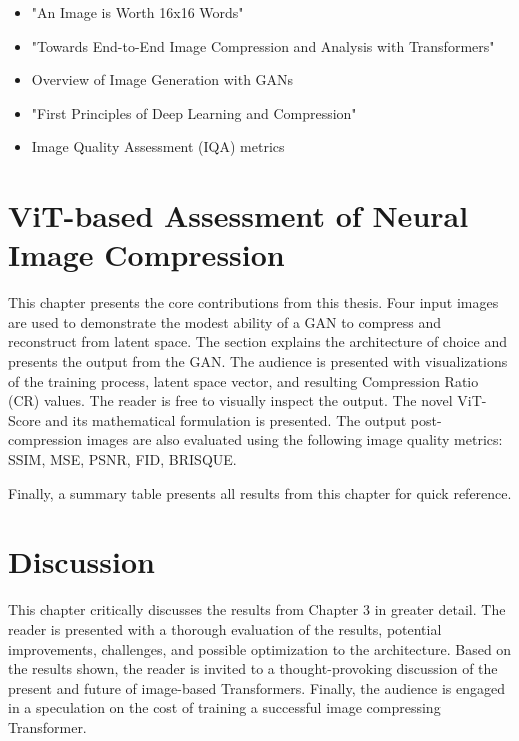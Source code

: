 \documentclass[pdftex,11pt,titlepage,twoside,openright]{report}
\begin{document}
\begin{itemize}
	\item "An Image is Worth 16x16 Words" \citep{dosovitskiy2020vit}
	\item "Towards End-to-End Image Compression and Analysis with Transformers" 

    \citep{Bai2022AAAI}
    \item Overview of Image Generation with GANs
	\item "First Principles of Deep Learning and Compression" \citep{Principles}
	\item Image Quality Assessment (IQA) metrics
    
    \citep{Metrics}
\end{itemize}

\ThinHRule

\newpage


\let\cleardoublepage\clearpage

\chapter{ViT-based Assessment of Neural Image Compression}


This chapter presents the core contributions from this thesis. Four input images
are used to demonstrate the modest ability of a GAN to compress and reconstruct from 
latent space. 
The section explains the architecture of choice and presents the output from the GAN.
The audience is presented with visualizations of the training process, latent space vector,
and resulting Compression Ratio (CR) values.
The reader is free to visually inspect the output.
The novel ViT-Score and its mathematical formulation is presented.
The output post-compression images are also evaluated using the following image quality metrics: 
SSIM, MSE, PSNR, FID, BRISQUE. 

Finally, a summary table presents all results from this chapter for quick reference. 

\ThinHRule

\newpage



\chapter{Discussion}

This chapter critically discusses the results from Chapter 3 in greater detail.
The reader is presented with a thorough evaluation of the results, potential improvements, 
challenges, and possible optimization to the architecture.
Based on the results shown, the reader is invited to a thought-provoking discussion of the
present and future of image-based Transformers.
Finally, the audience is engaged in a speculation on the cost of training a successful image compressing Transformer.
\end{document}
